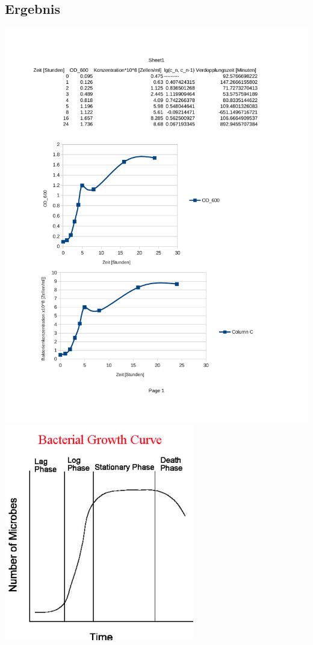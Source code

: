 \documentclass[12pt,twoside]{article}
\begin{document}
\subsection{Ergebnis}
\includegraphics[scale=0.9]{OD600.pdf}\newpage
\includegraphics[scale=0.7]{bacterial growth curve.jpg}
\end{document}
